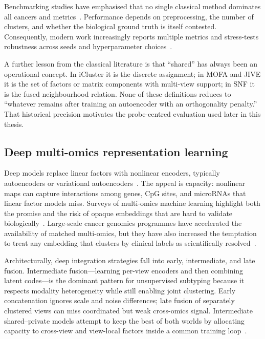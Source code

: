 Benchmarking studies have emphasised that no single classical method dominates all cancers and metrics~\citep{rappoport2021evaluation,cantini2021benchmarking}. Performance depends on preprocessing, the number of clusters, and whether the biological ground truth is itself contested. Consequently, modern work increasingly reports multiple metrics and stress-tests robustness across seeds and hyperparameter choices~\citep{baiao2025technical}.

A further lesson from the classical literature is that ``shared'' has always been an operational concept. In iCluster it is the discrete assignment; in MOFA and JIVE it is the set of factors or matrix components with multi-view support; in SNF it is the fused neighbourhood relation. None of these definitions reduces to ``whatever remains after training an autoencoder with an orthogonality penalty.'' That historical precision motivates the probe-centred evaluation used later in this thesis.

\subsection{Deep multi-omics representation learning}

Deep models replace linear factors with nonlinear encoders, typically autoencoders or variational autoencoders~\citep{kingma2013auto,Goodfellow-et-al-2016}. The appeal is capacity: nonlinear maps can capture interactions among genes, CpG sites, and microRNAs that linear factor models miss. Surveys of multi-omics machine learning highlight both the promise and the risk of opaque embeddings that are hard to validate biologically~\citep{hasin2017multi,xiao2022multi,jiang2022big,mohr2024navigating}. Large-scale cancer genomics programmes have accelerated the availability of matched multi-omics, but they have also increased the temptation to treat any embedding that clusters by clinical labels as scientifically resolved~\citep{jiang2022big}.

Architecturally, deep integration strategies fall into early, intermediate, and late fusion. Intermediate fusion---learning per-view encoders and then combining latent codes---is the dominant pattern for unsupervised subtyping because it respects modality heterogeneity while still enabling joint clustering. Early concatenation ignores scale and noise differences; late fusion of separately clustered views can miss coordinated but weak cross-omics signal. Intermediate shared--private models attempt to keep the best of both worlds by allocating capacity to cross-view and view-local factors inside a common training loop~\citep{xiao2022multi}.

